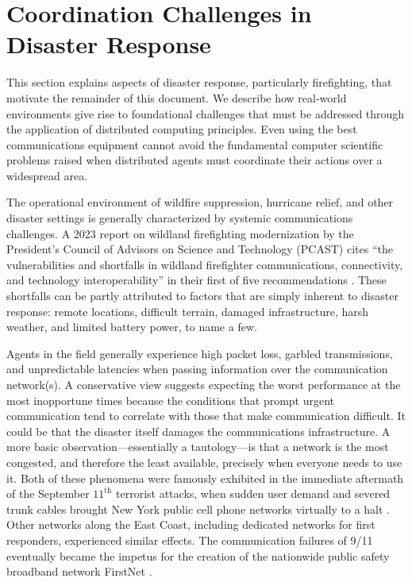 \documentclass[]             %
{NASA}                       %
\theoremstyle{definition}
\begin{document}
\section{Coordination Challenges in Disaster Response}
\label{sec:disaster-response}
This section explains aspects of disaster response, particularly
firefighting, that motivate the remainder of this document. We
describe how real-world environments give rise to foundational
challenges that must be addressed through the application of
distributed computing principles. Even using the best communications
equipment cannot avoid the fundamental computer scientific problems
raised when distributed agents must coordinate their actions over a
widespread area.

The operational environment of wildfire suppression, hurricane relief,
and other disaster settings is generally characterized by systemic
communications challenges. A 2023 report on wildland firefighting
modernization by the President’s Council of Advisors on Science and
Technology (PCAST) cites ``the vulnerabilities and shortfalls in
wildland firefighter communications, connectivity, and technology
interoperability'' in their first of five recommendations
\cite{pcast2023}. These shortfalls can be partly attributed to factors
that are simply inherent to disaster response: remote locations,
difficult terrain, damaged infrastructure, harsh weather, and limited
battery power, to name a few.

Agents in the field generally experience high packet loss, garbled
transmissions, and unpredictable latencies when passing information
over the communication network(s). A conservative view suggests
expecting the worst performance at the most inopportune times because
the conditions that prompt urgent communication tend to correlate with
those that make communication difficult. It could be that the disaster
itself damages the communications infrastructure. A more basic
observation---essentially a tautology---is that a network is the most
congested, and therefore the least available, precisely when everyone
needs to use it. Both of these phenomena were famously exhibited in
the immediate aftermath of the September $11^\textrm{th}$ terrorist
attacks, when sudden user demand and severed trunk cables brought New
York public cell phone networks virtually to a halt
\cite{2011:Reardon}. Other networks along the East Coast, including
dedicated networks for first responders, experienced similar
effects. The communication failures of 9/11 eventually became the
impetus for the creation of the nationwide public safety broadband
network FirstNet \cite{2021:firstnet, 2021:firstnet2}.
\end{document}
